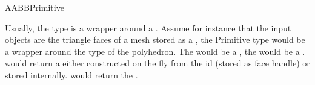 \begin{ccRefConcept}{AABBPrimitive}

\ccSeeAlso
{}

\ccExample

Usually, the  type is a wrapper around a . Assume for instance that the input objects are the triangle faces of a mesh stored as a , the Primitive type would be a wrapper around the   type of the polyhedron. The  would be a , the  would be a .  would return a  either constructed on the fly from the id (stored as face handle) or stored internally.  would return the . 

\end{ccRefConcept}

\ccRefPageEnd

